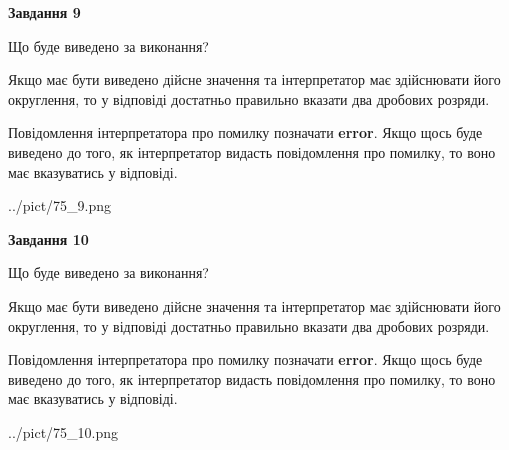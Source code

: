 \documentclass[12pt, ukrainian]{article}
\begin{document}
{\begin {Large}
{\begin {center}\textbf{Завдання 9}\end {center}}\par
Що буде виведено за виконання? \par

Якщо має бути виведено дійсне значення та інтерпретатор має здійснювати його округлення, 
то у відповіді достатньо правильно вказати два дробових розряди.

Повідомлення інтерпретатора про помилку позначати \textbf{error}.
Якщо щось буде виведено до того, як інтерпретатор видасть повідомлення про помилку, 
то воно має вказуватись у відповіді. \par

\begin{center}
	{../pict/75_9.png}
\end{center}
\newpage

{\begin {center}\textbf{Завдання 10}\end {center}}\par
Що буде виведено за виконання? \par

Якщо має бути виведено дійсне значення та інтерпретатор має здійснювати його округлення, 
то у відповіді достатньо правильно вказати два дробових розряди.

Повідомлення інтерпретатора про помилку позначати \textbf{error}.
Якщо щось буде виведено до того, як інтерпретатор видасть повідомлення про помилку, 
то воно має вказуватись у відповіді. \par

\begin{center}
	{../pict/75_10.png}
\end{center}
\newpage

\end {Large}}
\end{document}
